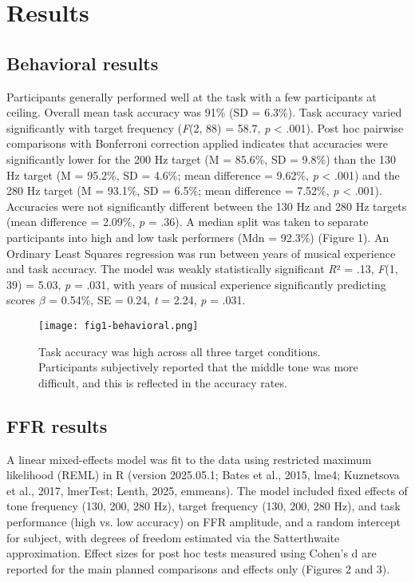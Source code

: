 \documentclass{article}
\begin{document}
\section*{Results}
\subsection*{Behavioral results}

Participants generally performed well at the task with a few participants at ceiling. Overall mean task accuracy was 91\% (SD = 6.3\%). Task accuracy varied significantly with target frequency (\textit{F}(2, 88) = 58.7, \textit{p} < .001). Post hoc pairwise comparisons with Bonferroni correction applied indicates that accuracies were significantly lower for the 200 Hz target (M = 85.6\%, SD = 9.8\%) than the 130 Hz target (M = 95.2\%, SD = 4.6\%; mean difference = 9.62\%, \textit{p} < .001) and the 280 Hz target (M = 93.1\%, SD = 6.5\%; mean difference = 7.52\%, \textit{p} < .001). Accuracies were not significantly different between the 130 Hz and 280 Hz targets (mean difference = 2.09\%, \textit{p} = .36). A median split was taken to separate participants into high and low task performers (Mdn = 92.3\%) (Figure 1). An Ordinary Least Squares regression was run between years of musical experience and task accuracy. The model was weakly statistically significant \textit{R}² = .13, \textit{F}(1, 39) = 5.03, \textit{p} = .031, with years of musical experience significantly predicting scores $\beta$ = 0.54\%, SE  = 0.24, \textit{t} = 2.24, \textit{p} = .031.

\begin{figure}
    \centering
    \texttt{[image: fig1-behavioral.png]}
    \caption{Task accuracy was high across all three target conditions. Participants subjectively reported that the middle tone was more difficult, and this is reflected in the accuracy rates.}
    \label{Figure 1}
\end{figure}

\subsection*{FFR results}
A linear mixed-effects model was fit to the data using restricted maximum likelihood (REML) in R (version 2025.05.1; Bates et al., 2015, lme4; Kuznetsova et al., 2017, lmerTest; Lenth, 2025, emmeans). The model included fixed effects of tone frequency (130, 200, 280 Hz), target frequency (130, 200, 280 Hz), and task performance (high vs. low accuracy) on FFR amplitude, and a random intercept for subject, with degrees of freedom estimated via the Satterthwaite approximation. Effect sizes for post hoc tests measured using Cohen’s d are reported for the main planned comparisons and effects only (Figures 2 and 3). 
\end{document}

